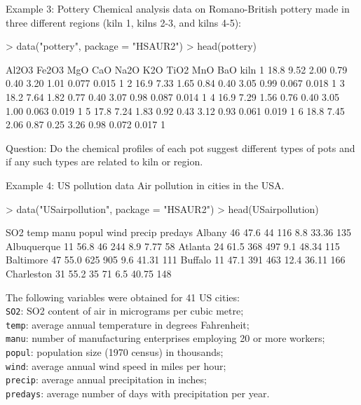 \documentclass[11pt,handout,aspectratio=169]{beamer}
\begin{document}
\begin{frame}[fragile]{Example 3: Pottery}
Chemical analysis data on Romano-British pottery made in three different regions (kiln 1, kilns 2-3, and kilns 4-5):{\scriptsize
\begin{Schunk}
\begin{Sinput}
> data("pottery", package = "HSAUR2")
> head(pottery)
\end{Sinput}
\begin{Soutput}
  Al2O3 Fe2O3  MgO  CaO Na2O  K2O TiO2   MnO   BaO kiln
1  18.8  9.52 2.00 0.79 0.40 3.20 1.01 0.077 0.015    1
2  16.9  7.33 1.65 0.84 0.40 3.05 0.99 0.067 0.018    1
3  18.2  7.64 1.82 0.77 0.40 3.07 0.98 0.087 0.014    1
4  16.9  7.29 1.56 0.76 0.40 3.05 1.00 0.063 0.019    1
5  17.8  7.24 1.83 0.92 0.43 3.12 0.93 0.061 0.019    1
6  18.8  7.45 2.06 0.87 0.25 3.26 0.98 0.072 0.017    1
\end{Soutput}
\end{Schunk}
}
Question: Do the chemical profiles of each pot suggest different types of pots and if any such types are related to kiln or region.
\end{frame}


\begin{frame}[fragile]{Example 4: US pollution data}
Air pollution in cities in the USA. 
{\scriptsize
\begin{Schunk}
\begin{Sinput}
> data("USairpollution", package = "HSAUR2")
> head(USairpollution)
\end{Sinput}
\begin{Soutput}
            SO2 temp manu popul wind precip predays
Albany       46 47.6   44   116  8.8  33.36     135
Albuquerque  11 56.8   46   244  8.9   7.77      58
Atlanta      24 61.5  368   497  9.1  48.34     115
Baltimore    47 55.0  625   905  9.6  41.31     111
Buffalo      11 47.1  391   463 12.4  36.11     166
Charleston   31 55.2   35    71  6.5  40.75     148
\end{Soutput}
\end{Schunk}
The following variables were obtained for 41 US cities:\\
\texttt{SO2}: SO2 content of air in micrograms per cubic metre;\\
\texttt{temp}: average annual temperature in degrees Fahrenheit;\\
\texttt{manu}: number of manufacturing enterprises employing 20 or more workers;\\
\texttt{popul}: population size (1970 census) in thousands;\\
\texttt{wind}: average annual wind speed in miles per hour;\\
\texttt{precip}: average annual precipitation in inches;\\
\texttt{predays}: average number of days with precipitation per year.

}
\end{frame}
\end{document}
